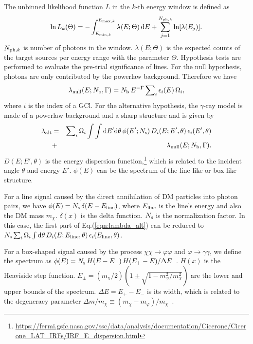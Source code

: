 \documentclass[
	twocolumn,
]{aastex6} %
\newcommand{\gr}{$\gamma$-ray\xspace}
\begin{document}
The unbinned likelihood function $L$ in the $k$-th energy window is defined as~\citep{Mattox1996,Ackermann2013a,Liang2016}
\begin{equation}
	\ln L_k(\Theta) = - \int_{E_{{\rm min},k}}^{E_{{\rm max},k}} \lambda(E;\Theta)\,{\rm d}E + \sum_{j=1}^{N_{{\rm ph},k}} \ln [\lambda(E_j)].
\end{equation}
$N_{{\rm ph},k}$ is number of photons in the window.
$\lambda(E;\Theta)$ is the expected counts of the target sources per energy range with the parameter $\Theta$.
Hypothesis tests are performed to evaluate the pre-trial significance of lines.
For the null hypothesis, photons are only contributed by the powerlaw background.
Therefore we have
\begin{equation}
	\lambda_{\rm null}(E;N_{\rm b},\Gamma) = N_{\rm b}\,E^{-\Gamma} \sum\nolimits_i \epsilon_i(E)\,\Omega_i,
\end{equation}
where $i$ is the index of a GCl.
For the alternative hypothesis, the \gr model is made of a powerlaw background and a sharp structure and is given by
\begin{eqnarray}
	\label{eqn:lambda_alt}
	\lambda_{\rm alt}
		&=& \sum\nolimits_i \Omega_i \int\int {\rm d}E'{\rm d}\theta\, \phi(E';N_{\rm s})\,D_i(E;E',\theta)\,\epsilon_i(E',\theta) \nonumber\\
		&+& \lambda_{\rm null}(E;N_{\rm b},\Gamma).
\end{eqnarray}
$D(E;E',\theta)$ is the energy dispersion function,\footnote{\url{https://fermi.gsfc.nasa.gov/ssc/data/analysis/documentation/Cicerone/Cicerone_LAT_IRFs/IRF_E_dispersion.html}}
which is related to the incident angle $\theta$ and energy $E'$.
$\phi(E)$ can be the spectrum of the line-like or box-like structure.

For a line signal caused by the direct annihilation of DM particles into photon pairs, we have $\phi(E)=N_{\rm s}\,\delta(E-E_{\rm line})$, where $E_{\rm line}$ is the line's energy and also the DM mass $m_\chi$.
$\delta(x)$ is the delta function.
$N_{\rm s}$ is the normalization factor.
In this case, the first part of Eq.(\ref{eqn:lambda_alt}) can be reduced to $N_{\rm s}\sum\nolimits_i \Omega_i \int {\rm d}\theta\, D_i(E;E_{\rm line}, \theta)\,\epsilon_i(E_{\rm line}, \theta)$.

For a box-shaped signal caused by the process $\chi\chi \to \varphi\varphi$ and $\varphi \to \gamma\gamma$, we define the spectrum as $\phi(E)=N_{\rm s}\,H(E - E_-)\,H(E_+ - E)/\Delta E$~\citep{Ibarra2012}.
$H(x)$ is the Heaviside step function.
$E_\pm = (m_\chi/2)(1\pm \sqrt{1-m_\varphi^2/m_\chi^2})$ are the lower and upper bounds of the spectrum.
$\Delta E=E_+-E_-$ is its width, which is related to the degeneracy parameter $\Delta m/m_\chi \equiv (m_\chi - m_\varphi)/m_\chi$~\citep{Ibarra2012}.
\end{document}
